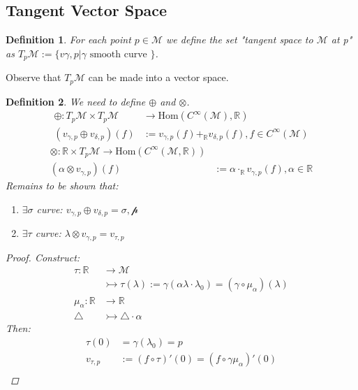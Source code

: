 \documentclass[10pt, oneside]{article}
\newcommand{\R}{\mathbb{R}}
\newcommand{\M}{\mathcal{M}}
\newtheorem{defn}{Definition}
\begin{document}
   \subsection*{Tangent Vector Space}
      \begin{defn}
         For each point $p \in \M$ we define the set "tangent space to $\M$ at p" as $T_p \M := \{v{\gamma,p} | \gamma \text{ smooth curve } \}$.
      \end{defn}
      Observe that $T_p \M$ can be made into a vector space. 
      \begin{defn}
         We need to define $\oplus$ and $\otimes$.
         \begin{align*}
            \oplus: T_p \M \times T_p \M &\to \text{Hom}(C^\infty(\M),\R) \\
            (v_{\gamma,p} \oplus v_{\delta,p})(f) &:= v_{\gamma,p}(f) +_{\R} v_{\delta,p} (f), f \in C^\infty (\M)
         \end{align*}
         \begin{align*}
            \otimes: \R \times T_p \M \to \text{Hom}(C^\infty(\M,\R)) \\
            (\alpha \otimes v_{\gamma,p})(f) &:= \alpha \cdot_{\R} v_{\gamma,p} (f), \alpha \in \R
         \end{align*}
         Remains to be shown that: 
         \begin{enumerate}
            \item $\exists \sigma$ curve: $v_{\gamma,p} \oplus v_{\delta,p} = \mathcal{\sigma,p}$
            \item $\exists \tau$ curve: $\lambda \otimes v_{\gamma,p} = v_{\tau,p}$
         \end{enumerate}
         \begin{proof}
            Construct: 
            \begin{align*}
               \tau: \R &\to \M \\
               &\rightarrowtail \tau(\lambda) := \gamma(\alpha \lambda \cdot \lambda_0) = (\gamma \circ \mu_{\alpha})(\lambda) \\
               \mu_\alpha: \R &\to \R \\
               \triangle &\rightarrowtail \triangle \cdot \alpha
            \end{align*}
            Then:
            \begin{align*}
               \tau (0) &= \gamma(\lambda_0) = p \\
               v_{\tau,p} &:= (f \circ \tau)'(0) = (f \circ \gamma \mu_\alpha)'(0) \\

\end{align*}
\end{proof}
\end{defn}
\end{document}
